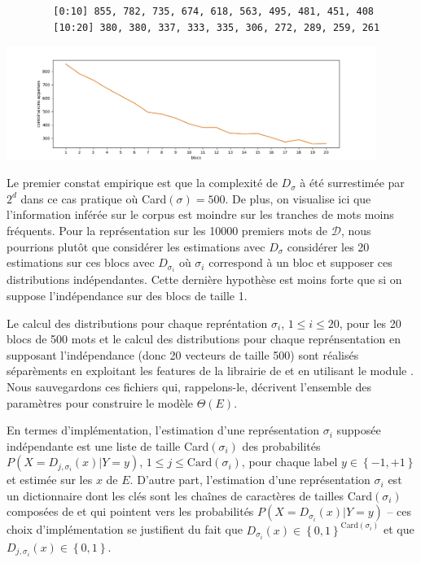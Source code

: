 \documentclass[a4paper, french]{article}
\begin{document}
\begin{table}[h]
\begin{center}
    \caption{\'Evaluation empirique de la complexit\'e de repr\'esentation}
    \label{table:combinaisons_decalages}
    \vskip 4mm
    \begin{lstlisting}
        [0:10] 855, 782, 735, 674, 618, 563, 495, 481, 451, 408
        [10:20] 380, 380, 337, 333, 335, 306, 272, 289, 259, 261
    \end{lstlisting}
    \includegraphics[width=12cm]{cn_decalages}
\end{center}
\end{table}

Le premier constat empirique est que la complexit\'e de $D_\sigma$ \`a \'et\'e
surrestim\'ee par $2^d$ dans ce cas pratique o\`u Card$(\sigma)=500$. De plus,
on visualise ici que l'information inf\'er\'ee sur le corpus est moindre sur
les tranches de mots moins fr\'equents. 
%
Pour la repr\'esentation sur les 10000 premiers mots de $\mathcal{D}$, 
nous pourrions plut\^ot que consid\'erer les estimations avec $D_{\sigma}$
consid\'erer les 20 estimations sur ces blocs avec $D_{\sigma_i}$ o\`u 
$\sigma_i$ correspond \`a un bloc et supposer ces distributions
ind\'ependantes. 
Cette derni\`ere hypoth\`ese est moins forte que si on suppose 
l'ind\'ependance sur des blocs de taille 1.

Le calcul des distributions pour chaque repr\'entation ${\sigma_i}$,
$1\leq i\leq 20$, pour les 20 blocs de 500 mots et le calcul des distributions 
pour chaque repr\'ensentation en supposant l'ind\'ependance 
(donc 20 vecteurs de taille 500) 
sont r\'ealis\'es s\'epar\`ements en exploitant les features de la librairie
 de  et en utilisant le module .
Nous sauvegardons ces fichiers qui, rappelons-le, d\'ecrivent l'ensemble des
param\`etres pour construire le mod\`ele $\Theta(E)$.

En termes d'impl\'ementation, l'estimation d'une repr\'esentation $\sigma_i$ 
suppos\'ee ind\'ependante est une liste de taille Card$(\sigma_i)$ 
des probabilit\'es $P(X=D_{j,\sigma_i}(x)|Y=y)$, $1\leq j\leq \text{Card}(\sigma_i)$,
pour chaque label $y\in\left\{-1,+1\right\}$ et estim\'ee sur les $x$ de $E$.
D'autre part, l'estimation d'une repr\'esentation $\sigma_i$ est un dictionnaire
dont les cl\'es sont les cha\^ines de caract\`eres de tailles 
Card$(\sigma_i)$ compos\'ees de  et 
qui pointent vers les probabilit\'es $P(X=D_{\sigma_i}(x)|Y=y)$ -- 
ces choix d'impl\'ementation se justifient du fait que
$D_{\sigma_i}(x)\in\left\{0,1\right\}^{\text{Card}(\sigma_i)}$ et
que $D_{j,\sigma_i}(x)\in\left\{0,1\right\}$.
\end{document}
